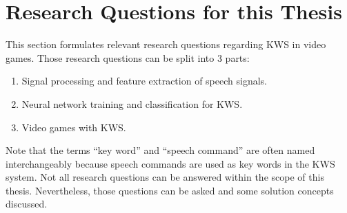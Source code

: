 
\section{Research Questions for this Thesis}\label{sec:intro_rq}
This section formulates relevant research questions regarding KWS in video games.
Those research questions can be split into 3 parts:
\begin{enumerate}[label={Q.\arabic*)}, leftmargin=1.4cm]
  \item Signal processing and feature extraction of speech signals.
  \item Neural network training and classification for KWS.
  \item Video games with KWS.
\end{enumerate}
Note that the terms \enquote{key word} and \enquote{speech command} are often named interchangeably because speech commands are used as key words in the KWS system.
Not all research questions can be answered within the scope of this thesis.
Nevertheless, those questions can be asked and some solution concepts discussed.



